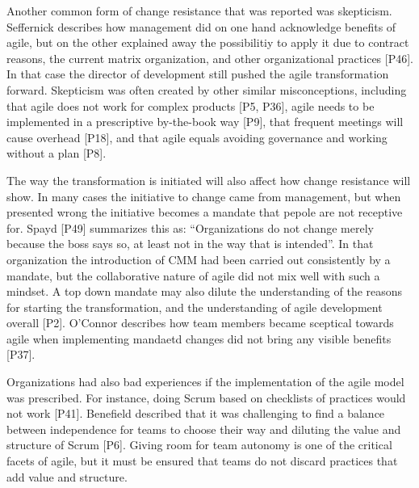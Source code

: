 \documentclass[preprint,authoryear,12pt]{elsarticle}
\begin{document}
Another common form of change resistance that was reported was skepticism.
Seffernick describes how management did on one hand acknowledge benefits of
agile, but on the other explained away the possibilitiy to apply it due to
contract reasons, the current matrix organization, and other organizational
practices [P46]. In that case the director of development still pushed the agile
transformation forward. Skepticism was often created by other similar
misconceptions, including that agile does not work for complex products [P5,
P36], agile needs to be implemented in a prescriptive by-the-book way [P9], that
frequent meetings will cause overhead [P18], and that agile equals avoiding
governance and working without a plan [P8].




The way the transformation is initiated will also affect how change resistance
will show.
In many cases the initiative to change came from management, but when presented
wrong the initiative becomes a mandate that pepole are not receptive for. Spayd
[P49] summarizes this as: ``Organizations do not change merely because the boss
says so, at least not in the way that is intended''. In that organization the
introduction of CMM had been carried out consistently by a mandate, but the
collaborative nature of agile did not mix well with such a mindset. A top down
mandate may also dilute the understanding of the reasons for starting the
transformation, and the understanding of agile development overall [P2].
O'Connor describes how team members became sceptical towards agile when
implementing mandaetd changes did not bring any visible benefits [P37].

Organizations had also bad experiences if the implementation of the agile model
was prescribed. For instance, doing Scrum based on checklists of practices would
not work [P41]. Benefield described that it was challenging to find a balance
between independence for teams to choose their way and diluting the value and
structure of Scrum [P6]. Giving room for team autonomy is one of the critical
facets of agile, but it must be ensured that teams do not discard practices that
add value and structure.
\end{document}
